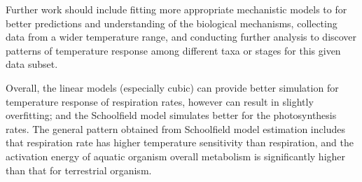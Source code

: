 \documentclass[11pt, a4paper]{article}
\begin{document}
\begin{spacing}{1.5}
Further work should include fitting more appropriate mechanistic models to for better predictions and understanding of the biological mechanisms, collecting data from a wider temperature range, and conducting further analysis to discover patterns of temperature response among different taxa or stages for this given data subset.  

Overall, the linear models (especially cubic) can provide better simulation for temperature response of respiration rates, however can result in slightly overfitting; and the Schoolfield model simulates better for the photosynthesis rates. The general pattern obtained from Schoolfield model estimation includes that respiration rate has higher temperature sensitivity than respiration, and the activation energy of aquatic organism overall metabolism is significantly higher than that for terrestrial organism. 




\end{spacing}
\end{document}
